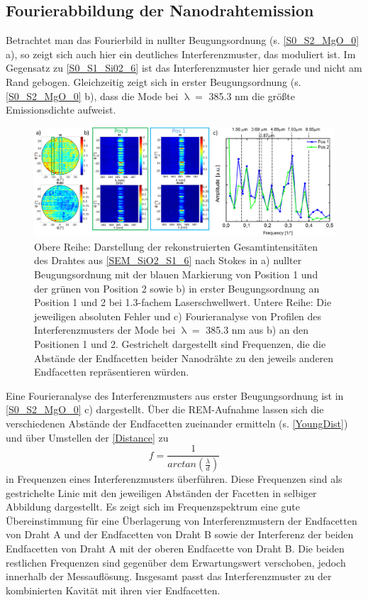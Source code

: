 \subsection{Fourierabbildung der Nanodrahtemission}
Betrachtet man das Fourierbild in nullter Beugungsordnung (s. \autoref{S0_S2_MgO_0} a), so zeigt sich auch hier ein deutliches Interferenzmuster, das moduliert ist. Im Gegensatz zu \autoref{S0_S1_Si02_6} ist das Interferenzmuster hier gerade und nicht am Rand gebogen. Gleichzeitig zeigt sich in erster Beugungsordnung (s. \autoref{S0_S2_MgO_0} b), dass die Mode bei $\uplambda = $ 385.3 nm die größte Emissionsdichte aufweist. \begin{figure}[h]
\centering
\includegraphics[width=1\textwidth]{Bilder/MgO/S0_S2_MgO_0}
\caption{Obere Reihe: Darstellung der rekonstruierten Gesamtintensitäten des Drahtes aus \autoref{SEM_SiO2_S1_6} nach Stokes in a) nullter Beugungsordnung mit der blauen Markierung von Position 1 und der grünen von Position 2 sowie b) in erster Beugungsordnung an Position 1 und 2 bei 1.3-fachem Laserschwellwert. Untere Reihe: Die jeweiligen absoluten Fehler und c) Fourieranalyse von Profilen des Interferenzmusters der Mode bei $\uplambda=$ 385.3 nm aus b) an den Positionen 1 und 2. Gestrichelt dargestellt sind Frequenzen, die die Abstände der Endfacetten beider Nanodrähte zu den jeweils anderen Endfacetten repräsentieren würden.}
\label{S0_S2_MgO_0}
\end{figure}Eine Fourieranalyse des Interferenzmusters aus erster Beugungsordnung ist in \autoref{S0_S2_MgO_0} c) dargestellt. Über die REM-Aufnahme lassen sich die verschiedenen Abstände der Endfacetten zueinander ermitteln (s. \autoref{YoungDist}) und über Umstellen der \autoref{Distance} zu
\begin{equation}
f=\frac{1}{arctan\left(\frac{\lambda}{d}\right)}
\end{equation}
in Frequenzen eines Interferenzmusters überführen. Diese Frequenzen sind als gestrichelte Linie mit den jeweiligen Abständen der Facetten in selbiger Abbildung dargestellt. Es zeigt sich im Frequenzspektrum eine gute Übereinstimmung für eine Überlagerung von Interferenzmustern der Endfacetten von Draht A  und der Endfacetten von Draht B sowie der Interferenz der beiden Endfacetten von Draht A mit der oberen Endfacette von Draht B. Die beiden restlichen Frequenzen sind gegenüber dem Erwartungswert verschoben, jedoch innerhalb der Messauflösung. Insgesamt passt das Interferenzmuster zu der kombinierten Kavität mit ihren vier Endfacetten.\\
